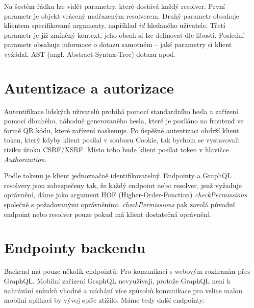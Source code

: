 Na šestém řádku lze vidět parametry, které dostává každý resolver. První parametr je objekt vrácený nadřazeným resolverem.
Druhý parametr obsahuje klientem specifikované argumenty, například $id$ hledaného uživatele.
Třetí parametr je již zmíněný kontext, jeho
obsah si lze definovat dle libosti.
Poslední parametr obsahuje informace o dotazu samotném --
jaké parametry si klient vyžádal, AST (angl. Abstract-Syntax-Tree) dotazu apod.

\section{Autentizace a autorizace} \label{auther_authen}

\noindent
Autentifikace lidských uživatelů probíhá pomocí standardního hesla a zařízení pomocí dlouhého, náhodně generovaného hesla,
které je posíláno na frontend ve formě QR kódu, které zařízení naskenuje.
Po úspěšné autentizaci obdrží klient token, který kdyby klient posílal v souboru Cookie,
tak bychom se vystavovali riziku útoku CSRF/XSRF.
Místo toho bude klient posílat token v hlavičce \textit{Authorization}.

Podle tokenu je klient jednoznačně identifikovatelný. Endpointy a GraphQL resolvery jsou zabezpečeny tak,
že každý endpoint nebo resolver, jenž vyžaduje oprávnění, dáme jako argument HOF (Higher-Order-Function)
\textit{checkPermissions} společně s požadovanými oprávněními. \textit{checkPermissions} pak zavolá původní
endpoint nebo resolver pouze pokud má klient dostatečná oprávnění.

\section{Endpointy backendu}

\noindent
Backend má pouze několik endpointů. Pro komunikaci s webovým rozhraním přes GraphQL.
Mobilní zařízení GraphQL nevyužívají, protože GraphQL není k nahrávání snímků vhodné a míchání více způsobů
komunikace pro velice malou mobilní aplikaci by vývoj spíše ztížilo. Máme tedy další endpointy:

